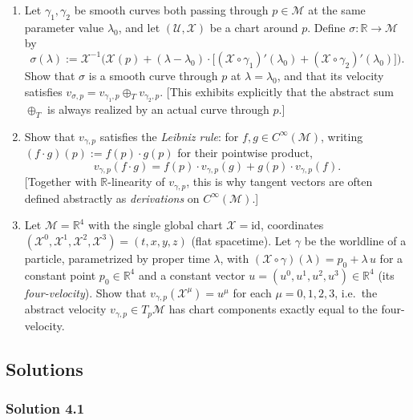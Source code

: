 \documentclass[11pt]{article}
\newcommand{\Cinf}{C^\infty(\mathcal M)}
\begin{document}
\begin{enumerate}[label=\textbf{4.\arabic*}, leftmargin=2.2cm, start=1]

\item \label{prob:curve-realizes-sum}
Let $\gamma_1,\gamma_2$ be smooth curves both passing through $p\in\mathcal
M$ at the same parameter value $\lambda_0$, and let $(\mathcal U,\mathcal
X)$ be a chart around $p$. Define $\sigma:\mathbb R\to\mathcal M$ by
\[
\sigma(\lambda):=\mathcal X^{-1}\Big(\mathcal X(p)+(\lambda-\lambda_0)\cdot\big[(\mathcal X\circ\gamma_1)'(\lambda_0)+(\mathcal X\circ\gamma_2)'(\lambda_0)\big]\Big).
\]
Show that $\sigma$ is a smooth curve through $p$ at $\lambda=\lambda_0$, and
that its velocity satisfies $v_{\sigma,p}=v_{\gamma_1,p}\oplus_T
v_{\gamma_2,p}$. [This exhibits explicitly that the abstract sum
$\oplus_T$ is always realized by an actual curve through $p$.]

\item \label{prob:leibniz}
Show that $v_{\gamma,p}$ satisfies the \emph{Leibniz rule}: for $f,g\in
\Cinf$, writing $(f\cdot g)(p):=f(p)\cdot g(p)$ for their pointwise product,
\[
v_{\gamma,p}(f\cdot g) = f(p)\cdot v_{\gamma,p}(g) + g(p)\cdot v_{\gamma,p}(f).
\]
[Together with $\mathbb R$-linearity of $v_{\gamma,p}$, this is why tangent
vectors are often defined abstractly as \emph{derivations} on $\Cinf$.]

\item \label{prob:four-velocity}
Let $\mathcal M=\mathbb R^4$ with the single global chart $\mathcal
X=\mathrm{id}$, coordinates $(\mathcal X^0,\mathcal X^1,\mathcal
X^2,\mathcal X^3)=(t,x,y,z)$ (flat spacetime). Let $\gamma$ be the worldline
of a particle, parametrized by proper time $\lambda$, with
$(\mathcal X\circ\gamma)(\lambda) = p_0 + \lambda\, u$ for a constant point
$p_0\in\mathbb R^4$ and a constant vector $u=(u^0,u^1,u^2,u^3)\in\mathbb
R^4$ (its \emph{four-velocity}). Show that $v_{\gamma,p}(\mathcal
X^\mu)=u^\mu$ for each $\mu=0,1,2,3$, i.e.\ the abstract velocity
$v_{\gamma,p}\in T_p\mathcal M$ has chart components exactly equal to the
four-velocity.

\end{enumerate}

\subsection*{Solutions}

\subsubsection*{Solution 4.1}
\end{document}

